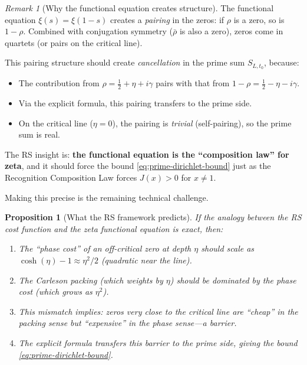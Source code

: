 \documentclass[11pt]{article}
\newtheorem{proposition}[theorem]{Proposition}
\theoremstyle{definition}
\theoremstyle{remark}
\newtheorem{remark}[theorem]{Remark}
\theoremstyle{definition}
\begin{document}
\begin{remark}[Why the functional equation creates structure]\label{rem:rs-structure}
The functional equation $\xi(s) = \xi(1-s)$ creates a \emph{pairing} in the zeros: if $\rho$ is a zero, so is $1 - \rho$. Combined with conjugation symmetry ($\bar{\rho}$ is also a zero), zeros come in quartets (or pairs on the critical line).

This pairing structure should create \emph{cancellation} in the prime sum $S_{L,t_0}$, because:
\begin{itemize}
\item The contribution from $\rho = \tfrac{1}{2} + \eta + i\gamma$ pairs with that from $1 - \rho = \tfrac{1}{2} - \eta - i\gamma$.
\item Via the explicit formula, this pairing transfers to the prime side.
\item On the critical line ($\eta = 0$), the pairing is \emph{trivial} (self-pairing), so the prime sum is real.
\end{itemize}

The RS insight is: \textbf{the functional equation is the ``composition law'' for zeta}, and it should force the bound \eqref{eq:prime-dirichlet-bound} just as the Recognition Composition Law forces $J(x) > 0$ for $x \neq 1$.

Making this precise is the remaining technical challenge.
\end{remark}

\begin{proposition}[What the RS framework predicts]\label{prop:rs-prediction}
If the analogy between the RS cost function and the zeta functional equation is exact, then:
\begin{enumerate}
\item The ``phase cost'' of an off-critical zero at depth $\eta$ should scale as $\cosh(\eta) - 1 \approx \eta^2/2$ (quadratic near the line).
\item The Carleson packing (which weights by $\eta$) should be dominated by the phase cost (which grows as $\eta^2$).
\item This mismatch implies: zeros very close to the critical line are ``cheap'' in the packing sense but ``expensive'' in the phase sense---a barrier.
\item The explicit formula transfers this barrier to the prime side, giving the bound \eqref{eq:prime-dirichlet-bound}.
\end{enumerate}
\end{proposition}
\end{document}
